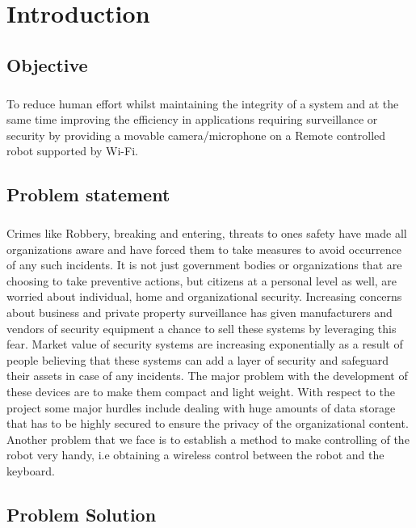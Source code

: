 \chapter{Introduction}
\section{Objective}
\paragraph{}To reduce human effort whilst maintaining the integrity of a system and at the same time improving the efficiency in applications requiring surveillance or security by providing a movable camera/microphone on a Remote controlled robot supported by Wi-Fi.
\section{Problem statement}
\paragraph{}Crimes like Robbery, breaking and entering, threats to ones safety have made
all organizations aware and have forced them to take measures to avoid
occurrence of any such incidents. It is not just government bodies or organizations that are
choosing to take preventive actions, but citizens at a personal level as well, are
worried about individual, home and organizational security.
Increasing concerns about business and private property surveillance has given
manufacturers and vendors of security equipment a chance to sell these systems
by leveraging this fear. Market value of security systems are increasing exponentially as a result of people believing that these systems can add a layer of security and safeguard their
assets in case of any incidents.
The major problem with the development of these devices are to make them
compact and light weight. With respect to the project some major hurdles include
dealing with huge amounts of data storage that has to be highly secured to ensure the
privacy of the organizational content. Another problem that we face is to establish a
method to make controlling of the robot very handy, i.e obtaining a wireless control
between the robot and the keyboard.
\section{Problem Solution}
